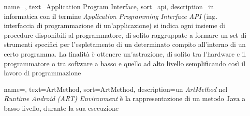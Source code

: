 
\renewcommand{\acronymname}{Acronimi e abbreviazioni}













\renewcommand{\glossaryname}{Glossario}

{
	name=,
	text=Application Program Interface,
	sort=api,
	description={in informatica con il termine \emph{Application Programming Interface API} (ing. interfaccia di programmazione di un'applicazione) si indica ogni insieme di procedure disponibili al programmatore, di solito raggruppate a formare un set di strumenti specifici per l'espletamento di un determinato compito all'interno di un certo programma. La finalità è ottenere un'astrazione, di solito tra l'hardware e il programmatore o tra software a basso e quello ad alto livello semplificando così il lavoro di programmazione}
}

{
	name=,
	text=ArtMethod,
	sort=ArtMethod,
	description={un \emph{ArtMethod} nel \emph{Runtime Android (ART) Environment} è la rappresentazione di un metodo Java a basso livello, durante la sua esecuzione }
}


